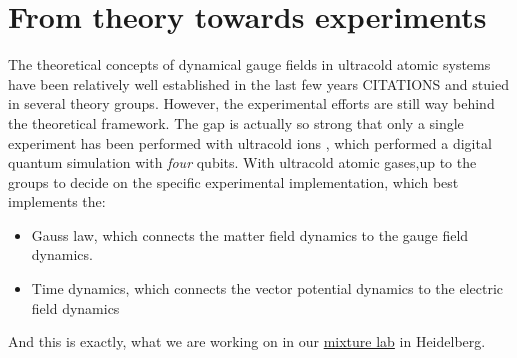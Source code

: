 \documentclass[10pt]{article}
\let\cite\citep
\providecommand\citep{\cite}
\begin{document}
\section{From theory towards
experiments}\label{from-theory-towards-experiments}

The theoretical concepts of dynamical gauge fields in ultracold atomic
systems have been relatively well established in the last few years
CITATIONS and stuied in several theory groups. However, the experimental
efforts are still way behind the theoretical framework. The gap is
actually so strong that only a single experiment has been performed with
ultracold ions \cite{Martinez_2016}, which performed a digital quantum
simulation with \emph{four} qubits. With ultracold atomic gases,up to
the groups to decide on the specific experimental implementation, which
best implements the:

\begin{itemize}
\tightlist
\item
  Gauss law, which connects the matter field dynamics to the gauge field
  dynamics.
\item
  Time dynamics, which connects the vector potential dynamics to the
  electric field dynamics
\end{itemize}

And this is exactly, what we are working on in our
\href{https://www.kip.uni-heidelberg.de/synqs/dyngauge}{mixture lab} in
Heidelberg.

\FloatBarrier


\end{document}
